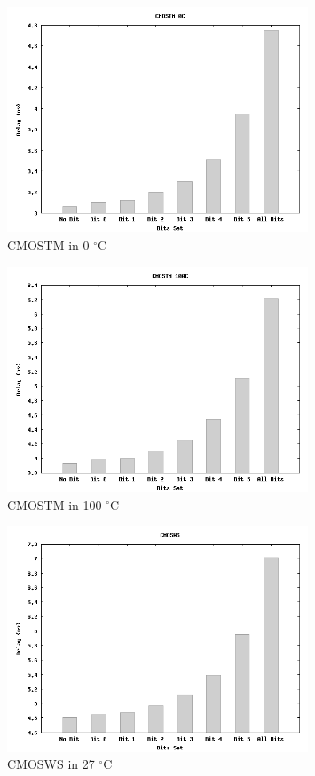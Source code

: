 \documentclass[a4paper,12pt]{article} \usepackage{graphicx}
\newcommand{\degree}{\ensuremath{^\circ}}
\begin{document}
\begin{figure}[h!]
        \centering
        \includegraphics[width=0.8\textwidth]{../Bilder/Delay_Line/CMOSTM0.png}
        \caption{CMOSTM in 0 \degree C}
        \label{fig:CMOSTM0}
\end{figure}

\begin{figure}[h!]
        \centering
        \includegraphics[width=0.8\textwidth]{../Bilder/Delay_Line/CMOSTM100.png}
        \caption{CMOSTM in 100 \degree C}
        \label{fig:CMOSTM100}
\end{figure}

\begin{figure}[h!]
        \centering
        \includegraphics[width=0.8\textwidth]{../Bilder/Delay_Line/CMOSWS.png}
        \caption{CMOSWS in 27 \degree C}
        \label{fig:CMOSWS}
\end{figure}
\end{document}
